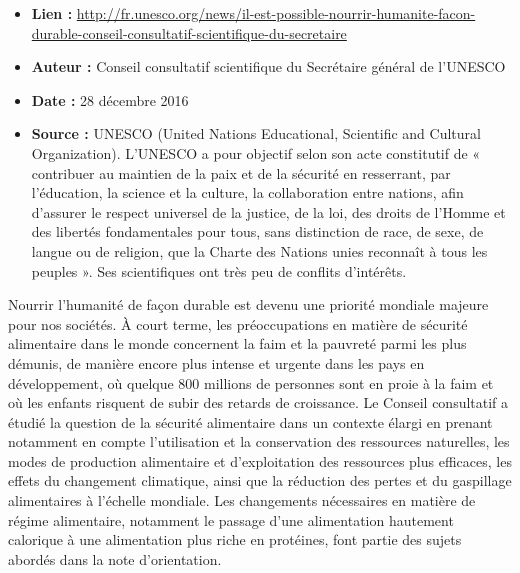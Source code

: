 \documentclass[8pt]{article}
\begin{document}
\begin{itemize}
	\item \textbf{Lien : }  \url{http://fr.unesco.org/news/il-est-possible-nourrir-humanite-facon-durable-conseil-consultatif-scientifique-du-secretaire} 
	\item \textbf{Auteur : } Conseil consultatif scientifique du Secrétaire général de l'UNESCO
	\item \textbf{Date : } 28 décembre 2016
	\item \textbf{Source : } UNESCO (United Nations Educational, Scientific and Cultural Organization). L'UNESCO a pour objectif selon son acte constitutif de « contribuer au maintien de la paix et de la sécurité en resserrant, par l’éducation, la science et la culture, la collaboration entre nations, afin d’assurer le respect universel de la justice, de la loi, des droits de l’Homme et des libertés fondamentales pour tous, sans distinction de race, de sexe, de langue ou de religion, que la Charte des Nations unies reconnaît à tous les peuples ». Ses scientifiques ont très peu de conflits d'intérêts.
\end{itemize}

Nourrir l’humanité de façon durable est devenu une priorité mondiale majeure pour nos sociétés. À court terme, les préoccupations en matière de sécurité alimentaire dans le monde concernent la faim et la pauvreté parmi les plus démunis, de manière encore plus intense et urgente dans les pays en développement, où quelque 800 millions de personnes sont en proie à la faim et où les enfants risquent de subir des retards de croissance. Le Conseil consultatif a étudié la question de la sécurité alimentaire dans un contexte élargi en prenant notamment en compte l’utilisation et la conservation des ressources naturelles, les modes de production alimentaire et d’exploitation des ressources plus efficaces, les effets du changement climatique, ainsi que la réduction des pertes et du gaspillage alimentaires à l’échelle mondiale. Les changements nécessaires en matière de régime alimentaire, notamment le passage d’une alimentation hautement calorique à une alimentation plus riche en protéines, font partie des sujets abordés dans la note d’orientation.\\
\end{document}
